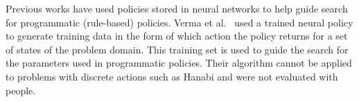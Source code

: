 \documentclass[letterpaper]{article} %
\begin{document}
Previous works have used policies stored in neural networks to help guide search for programmatic (rule-based) policies. Verma et al.~ used a trained neural policy to generate training data in the form of which action the policy returns for a set of states of the problem domain. This training set is used to guide the search for the parameters used in programmatic policies. Their algorithm cannot be applied to problems with discrete actions such as Hanabi and were not evaluated with people.





\end{document}
